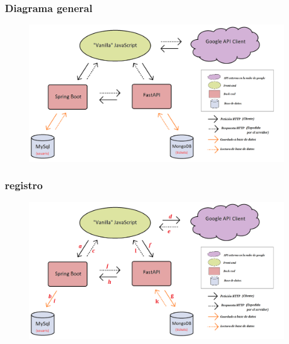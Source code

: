 \documentclass{beamer}
\begin{document}
			\begin{frame}
				\frametitle{Diagrama general}
				 
		
				\begin{figure}
					\centering
					\includegraphics[width=1\linewidth]{../img/diagramaSistemesAplicacioMercapp}
					
					\label{fig:diagramasistemesaplicaciomercapp}
				\end{figure}
				
			\end{frame}
			
			
			\begin{frame}
				\frametitle{registro}
				
				\begin{figure}
					\centering
					\includegraphics[width=1\linewidth]{../img/diagramaSistemesAplicacioMercappCAMIREGISTREbo}
					
					\label{fig:diagramasistemesaplicaciomercappcamiregistrebo}
				\end{figure}
				
			\end{frame}
			
\end{document}
